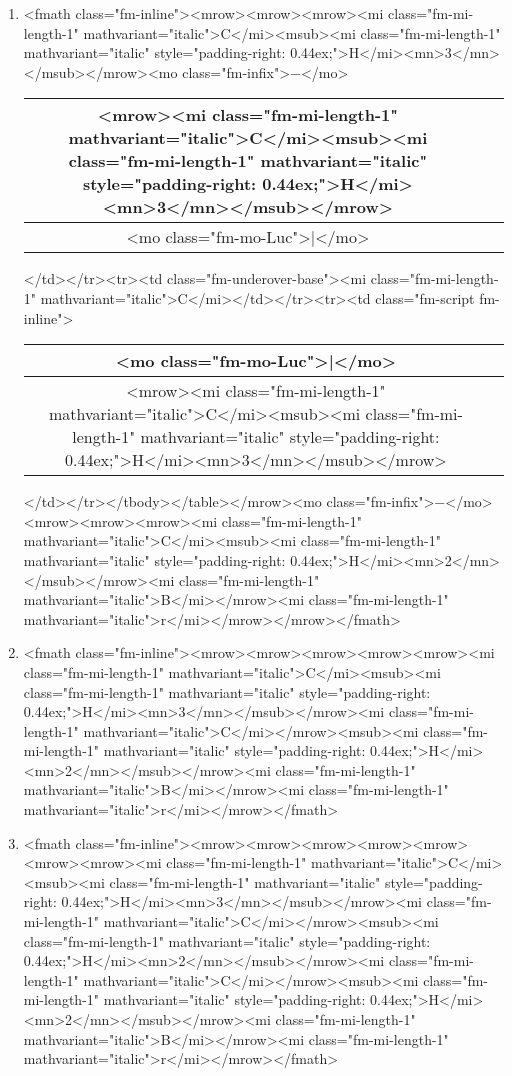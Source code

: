 \documentclass{article}
\begin{document}
\begin{enumerate}[label=(\alph*)]
\item <fmath class="fm-inline"><mrow><mrow><mrow><mi class="fm-mi-length-1" mathvariant="italic">C</mi><msub><mi class="fm-mi-length-1" mathvariant="italic" style="padding-right: 0.44ex;">H</mi><mn>3</mn></msub></mrow><mo class="fm-infix">−</mo>\begin{tabular}{|c|c|c|}
\hline
<mrow><mi class="fm-mi-length-1" mathvariant="italic">C</mi><msub><mi class="fm-mi-length-1" mathvariant="italic" style="padding-right: 0.44ex;">H</mi><mn>3</mn></msub></mrow> \\
\hline
<mo class="fm-mo-Luc">|</mo> \\
\hline
\end{tabular}
</td></tr><tr><td class="fm-underover-base"><mi class="fm-mi-length-1" mathvariant="italic">C</mi></td></tr><tr><td class="fm-script fm-inline">\begin{tabular}{|c|c|}
\hline
<mo class="fm-mo-Luc">|</mo> \\
\hline
<mrow><mi class="fm-mi-length-1" mathvariant="italic">C</mi><msub><mi class="fm-mi-length-1" mathvariant="italic" style="padding-right: 0.44ex;">H</mi><mn>3</mn></msub></mrow> \\
\hline
\end{tabular}
</td></tr></tbody></table></mrow><mo class="fm-infix">−</mo><mrow><mrow><mrow><mi class="fm-mi-length-1" mathvariant="italic">C</mi><msub><mi class="fm-mi-length-1" mathvariant="italic" style="padding-right: 0.44ex;">H</mi><mn>2</mn></msub></mrow><mi class="fm-mi-length-1" mathvariant="italic">B</mi></mrow><mi class="fm-mi-length-1" mathvariant="italic">r</mi></mrow></mrow></fmath>
\item <fmath class="fm-inline"><mrow><mrow><mrow><mrow><mrow><mi class="fm-mi-length-1" mathvariant="italic">C</mi><msub><mi class="fm-mi-length-1" mathvariant="italic" style="padding-right: 0.44ex;">H</mi><mn>3</mn></msub></mrow><mi class="fm-mi-length-1" mathvariant="italic">C</mi></mrow><msub><mi class="fm-mi-length-1" mathvariant="italic" style="padding-right: 0.44ex;">H</mi><mn>2</mn></msub></mrow><mi class="fm-mi-length-1" mathvariant="italic">B</mi></mrow><mi class="fm-mi-length-1" mathvariant="italic">r</mi></mrow></fmath>
\item <fmath class="fm-inline"><mrow><mrow><mrow><mrow><mrow><mrow><mrow><mi class="fm-mi-length-1" mathvariant="italic">C</mi><msub><mi class="fm-mi-length-1" mathvariant="italic" style="padding-right: 0.44ex;">H</mi><mn>3</mn></msub></mrow><mi class="fm-mi-length-1" mathvariant="italic">C</mi></mrow><msub><mi class="fm-mi-length-1" mathvariant="italic" style="padding-right: 0.44ex;">H</mi><mn>2</mn></msub></mrow><mi class="fm-mi-length-1" mathvariant="italic">C</mi></mrow><msub><mi class="fm-mi-length-1" mathvariant="italic" style="padding-right: 0.44ex;">H</mi><mn>2</mn></msub></mrow><mi class="fm-mi-length-1" mathvariant="italic">B</mi></mrow><mi class="fm-mi-length-1" mathvariant="italic">r</mi></mrow></fmath>

\end{enumerate}
\end{document}
